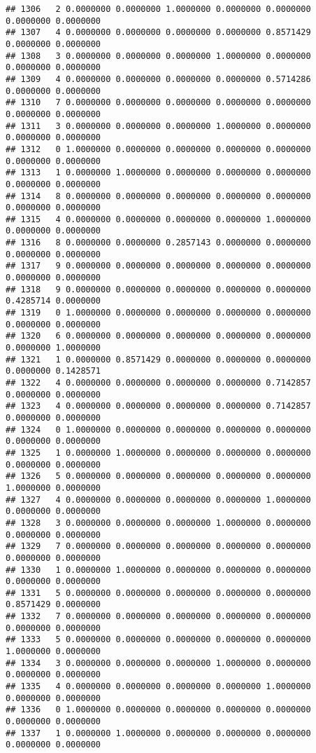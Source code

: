 \documentclass[
]{article}
\begin{document}
\begin{verbatim}
## 1306   2 0.0000000 0.0000000 1.0000000 0.0000000 0.0000000 0.0000000 0.0000000
## 1307   4 0.0000000 0.0000000 0.0000000 0.0000000 0.8571429 0.0000000 0.0000000
## 1308   3 0.0000000 0.0000000 0.0000000 1.0000000 0.0000000 0.0000000 0.0000000
## 1309   4 0.0000000 0.0000000 0.0000000 0.0000000 0.5714286 0.0000000 0.0000000
## 1310   7 0.0000000 0.0000000 0.0000000 0.0000000 0.0000000 0.0000000 0.0000000
## 1311   3 0.0000000 0.0000000 0.0000000 1.0000000 0.0000000 0.0000000 0.0000000
## 1312   0 1.0000000 0.0000000 0.0000000 0.0000000 0.0000000 0.0000000 0.0000000
## 1313   1 0.0000000 1.0000000 0.0000000 0.0000000 0.0000000 0.0000000 0.0000000
## 1314   8 0.0000000 0.0000000 0.0000000 0.0000000 0.0000000 0.0000000 0.0000000
## 1315   4 0.0000000 0.0000000 0.0000000 0.0000000 1.0000000 0.0000000 0.0000000
## 1316   8 0.0000000 0.0000000 0.2857143 0.0000000 0.0000000 0.0000000 0.0000000
## 1317   9 0.0000000 0.0000000 0.0000000 0.0000000 0.0000000 0.0000000 0.0000000
## 1318   9 0.0000000 0.0000000 0.0000000 0.0000000 0.0000000 0.4285714 0.0000000
## 1319   0 1.0000000 0.0000000 0.0000000 0.0000000 0.0000000 0.0000000 0.0000000
## 1320   6 0.0000000 0.0000000 0.0000000 0.0000000 0.0000000 0.0000000 1.0000000
## 1321   1 0.0000000 0.8571429 0.0000000 0.0000000 0.0000000 0.0000000 0.1428571
## 1322   4 0.0000000 0.0000000 0.0000000 0.0000000 0.7142857 0.0000000 0.0000000
## 1323   4 0.0000000 0.0000000 0.0000000 0.0000000 0.7142857 0.0000000 0.0000000
## 1324   0 1.0000000 0.0000000 0.0000000 0.0000000 0.0000000 0.0000000 0.0000000
## 1325   1 0.0000000 1.0000000 0.0000000 0.0000000 0.0000000 0.0000000 0.0000000
## 1326   5 0.0000000 0.0000000 0.0000000 0.0000000 0.0000000 1.0000000 0.0000000
## 1327   4 0.0000000 0.0000000 0.0000000 0.0000000 1.0000000 0.0000000 0.0000000
## 1328   3 0.0000000 0.0000000 0.0000000 1.0000000 0.0000000 0.0000000 0.0000000
## 1329   7 0.0000000 0.0000000 0.0000000 0.0000000 0.0000000 0.0000000 0.0000000
## 1330   1 0.0000000 1.0000000 0.0000000 0.0000000 0.0000000 0.0000000 0.0000000
## 1331   5 0.0000000 0.0000000 0.0000000 0.0000000 0.0000000 0.8571429 0.0000000
## 1332   7 0.0000000 0.0000000 0.0000000 0.0000000 0.0000000 0.0000000 0.0000000
## 1333   5 0.0000000 0.0000000 0.0000000 0.0000000 0.0000000 1.0000000 0.0000000
## 1334   3 0.0000000 0.0000000 0.0000000 1.0000000 0.0000000 0.0000000 0.0000000
## 1335   4 0.0000000 0.0000000 0.0000000 0.0000000 1.0000000 0.0000000 0.0000000
## 1336   0 1.0000000 0.0000000 0.0000000 0.0000000 0.0000000 0.0000000 0.0000000
## 1337   1 0.0000000 1.0000000 0.0000000 0.0000000 0.0000000 0.0000000 0.0000000

\end{verbatim}
\end{document}
